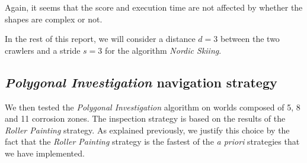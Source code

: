 Again, it seems that the score and execution time are not affected by whether the shapes are complex or not.

In the rest of this report, we will consider a distance $d = 3$ between the two crawlers and a stride $s = 3$ for the algorithm \textit{Nordic Skiing}.

\subsection*{\textit{Polygonal Investigation} navigation strategy}

We then tested the \textit{Polygonal Investigation} algorithm on worlds composed of 5, 8 and 11 corrosion zones.
The inspection strategy is based on the results of the \textit{Roller Painting} strategy.
As explained previously, we justify this choice by the fact that the \textit{Roller Painting} strategy is the fastest of the \textit{a priori} strategies that we have implemented.

